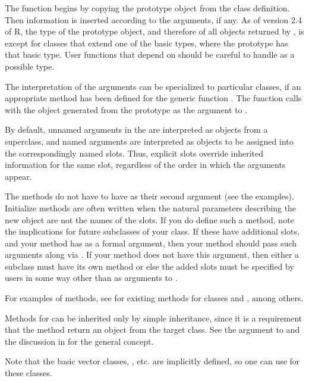 %
\begin{Details}\relax
The function  begins by copying the prototype object from
the class definition.  Then information is inserted according to the
 arguments, if any.  As of version 2.4 of R, the type of
the prototype object, and therefore of all objects returned by
, is  except for classes that extend
one of the basic types, where the prototype has that basic type.  User
functions that depend on  should be
careful to handle  as a possible type.

The interpretation of the  arguments can be specialized to
particular classes, if an appropriate method has been defined for the
generic function .  The  function calls
 with the object generated from the prototype as the
 argument to .

By default, unnamed arguments in the  are interpreted as
objects from a superclass, and named arguments are interpreted as
objects to be assigned into the correspondingly named slots.  Thus,
explicit slots override inherited information for the same slot,
regardless of the order in which the arguments appear.

The  methods do not have to have  as
their second argument (see the examples).  Initialize methods are
often written when the natural parameters describing the new object
are not the names of the slots.  If you do define such a method,
note the implications for future subclasses of your class.  If these
have additional slots, and your  method has
 as a formal argument, then your method should pass such
arguments along via .  If your method
does not have this argument, then either a subclass must have its
own method or else the added slots must be specified by users in
some way other than as arguments to .

For examples of  methods, see
 for existing methods for
classes  and , among others.

Methods for  can be inherited only by simple
inheritance, since it is a requirement that the method return an
object from the target class.  See the
 argument to  and
the discussion in  for the general concept.

Note that the basic vector classes, , etc. are
implicitly defined, so one can use  for these classes.
\end{Details}
